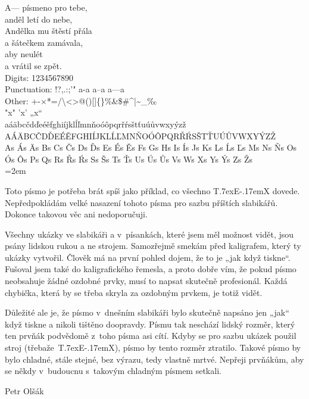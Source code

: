 \documentclass{article}
\begin{document}
\fontsize{25pt}{30pt}

\noindent A--- písmeno pro tebe,\\
anděl letí do nebe,\\
Andělka mu štěstí přála\\
a šátečkem zamávala,\\
aby neulét\\
a vrátil se zpět.\\

\noindent Digits: 1234567890\\
Punctuation: !?,.:;'" a-a a--a a---a\\
Other: +-×*=/\textbackslash <>@()[]\{\}\%\&\$\#\^{}|\~{}\_‰\\
"x" 'x' „x“\\
aáäbcčdďeéěfghiíjklĺľmnňoóôpqrřŕsštťuúůvwxyýzž\\
AÁÄBCČDĎEÉĚFGHIÍJKLĹĽMNŇOÓÔPQRŘŔSŠTŤUÚŮVWXYÝZŽ\\
As Ás Äs Bs Cs Čs Ds Ďs Es És Ěs Fs Gs Hs Is Ís Js Ks Ls Ĺs Ľs Ms Ns Ňs Os Ós Ôs Ps Qs Rs Řs Ŕs Ss Šs Ts Ťs Us Ús Ůs Vs Ws Xs Ys Ýs Zs Žs\\


\def\TeX{T\lower.7ex\hbox{E}\kern-.17emX}
  \emergencystretch=2em

Toto písmo je potřeba brát spíš jako příklad, co všechno \TeX{} dovede.
Nepředpokládám velké nasazení tohoto písma pro sazbu příštích
slabikářů. Dokonce takovou věc ani nedoporučuji.

Všechny ukázky ve slabikáři a v~písankách, které jsem měl možnost vidět,
jsou psány lidskou rukou a ne strojem. Samozřejmě smekám před kaligrafem,
který ty ukázky vytvořil. Člověk má na první pohled dojem, že to je
„jak když tiskne“. Fušoval jsem také do kaligrafického řemesla, a proto
dobře vím, že pokud písmo neobsahuje žádné ozdobné prvky, musí to napsat
skutečně profesionál. Každá chybička, která by se třeba skryla za ozdobným
prvkem, je totiž vidět.

Důležité ale je, že písmo v~dnešním slabikáři bylo skutečně napsáno jen
„jak“ když tiskne a nikoli tištěno doopravdy. Písmu tak neschází
lidský rozměr, který ten prvňák podvědomě z~toho písma asi cítí. Kdyby se
pro sazbu ukázek použil stroj (třebaže~\TeX), písmo by tento rozměr
ztratilo. Takové písmo by bylo chladné, stále stejné, bez výrazu,
tedy vlastně mrtvé. Nepřeji prvňákům, aby se někdy v~budoucnu
s~takovým chladným písmem setkali.

\medskip
\hfill Petr Olšák
\end{document}
